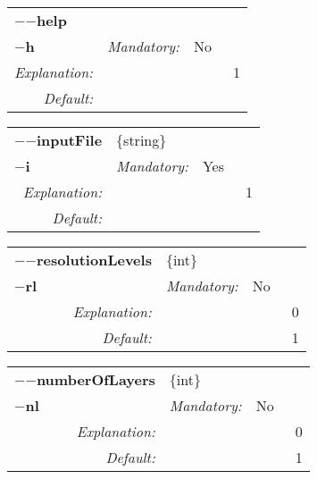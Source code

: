\begin{center}\begin{tabular}{|rr|rlrl|}
\hline
\multicolumn{2}{|l|}{\textbf{$-$$-$help}} & \multicolumn{4}{|l|}{} \\
\cline{3-6}
\multicolumn{2}{|l|}{\textbf{$-$h}} & \emph{Mandatory:} & No & &  \\
\hline
\emph{Explanation:} & \multicolumn{5}{|p{12cm}|}{1} \\
\hline
\emph{Default:} & \multicolumn{5}{|p{12cm}|}{} \\
\hline
\end{tabular}\end{center}
\begin{center}\begin{tabular}{|rr|rlrl|}
\hline
\multicolumn{2}{|l|}{\textbf{$-$$-$inputFile}} & \multicolumn{4}{|l|}{$\{$string$\}$} \\
\cline{3-6}
\multicolumn{2}{|l|}{\textbf{$-$i}} & \emph{Mandatory:} & Yes & &  \\
\hline
\emph{Explanation:} & \multicolumn{5}{|p{12cm}|}{1} \\
\hline
\emph{Default:} & \multicolumn{5}{|p{12cm}|}{} \\
\hline
\end{tabular}\end{center}
\begin{center}\begin{tabular}{|rr|rlrl|}
\hline
\multicolumn{2}{|l|}{\textbf{$-$$-$resolutionLevels}} & \multicolumn{4}{|l|}{$\{$int$\}$} \\
\cline{3-6}
\multicolumn{2}{|l|}{\textbf{$-$rl}} & \emph{Mandatory:} & No & &  \\
\hline
\emph{Explanation:} & \multicolumn{5}{|p{12cm}|}{0} \\
\hline
\emph{Default:} & \multicolumn{5}{|p{12cm}|}{1} \\
\hline
\end{tabular}\end{center}
\begin{center}\begin{tabular}{|rr|rlrl|}
\hline
\multicolumn{2}{|l|}{\textbf{$-$$-$numberOfLayers}} & \multicolumn{4}{|l|}{$\{$int$\}$} \\
\cline{3-6}
\multicolumn{2}{|l|}{\textbf{$-$nl}} & \emph{Mandatory:} & No & &  \\
\hline
\emph{Explanation:} & \multicolumn{5}{|p{12cm}|}{0} \\
\hline
\emph{Default:} & \multicolumn{5}{|p{12cm}|}{1 } \\
\hline
\end{tabular}\end{center}
